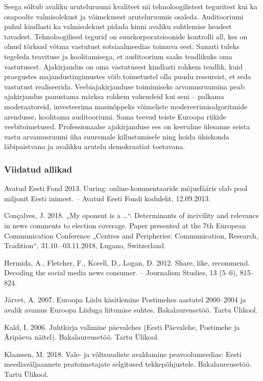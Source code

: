 \documentclass[estonian,]{article}
\begin{document}
Seega sõltub avaliku aruteluruumi kvaliteet nii tehnoloogilistest teguritest kui ka osapoolte valmisolekust ja võimekusest aruteluruumis osaleda. Auditooriumi puhul kindlasti ka valmisolekust pidada kinni avaliku suhtlemise headest tavadest. Tehnoloogilised tegurid on suurkorporatsioonide kontrolli all, kes on olnud tõrksad võtma vastutust sotsiaalmeedias toimuva eest. Samuti tuleks tegeleda teavituse ja koolitamisega, et auditoorium saaks teadlikuks oma vastutusest. Ajakirjandus on oma vastutusest kindlasti rohkem teadlik, kuid praegustes majandustingimustes võib toimetustel olla puudu ressursist, et seda vastutust realiseerida. Veebiajakirjanduse toimimiseks arvamusruumina peab ajakirjandus panustama märksa rohkem vahendeid kui seni -- palkama moderaatoreid, investeerima masinõppeks võimeliste modereerimisalgoritmide arendusse, koolitama auditooriumi. Sama teevad teiste Euroopa riikide veebitoimetused. Professionaalse ajakirjanduse ees on keeruline ülesanne seista vastu arvamusruumi üha suuremale killustumisele ning hoida ühiskonda läbipaistvana ja avalikku arutelu demokraatiat toetavana.

\hypertarget{viidatud-allikad-19}{%
\subsubsection*{Viidatud allikad}\label{viidatud-allikad-19}}

Avatud Eesti Fond 2013. Uuring: online-kommentaaride mõjusfääris elab pool miljonit Eesti inimest. -- Avatud Eesti Fondi koduleht, 12.09.2013.

Conçalves, J. 2018. „My oponent is a \ldots{}``. Determinants of incivility and relevance in news comments to election coverage. Paper presented at the 7th European Communication Conference „Centres and Peripheries: Communication, Research, Tradition``, 31.10.--03.11.2018, Lugano, Switzerland.

Hermida, A., Fletcher, F., Korell, D., Logan, D. 2012. Share, like, recommend. Decoding the social media news consumer. -- Journalism Studies, 13 (5--6), 815--824.

Järvet, A. 2007. Euroopa Liidu käsitlemine Postimehes aastatel 2000--2004 ja avalik avamus Euroopa Liiduga liitumise suhtes. Bakalaureusetöö. Tartu Ülikool.

Kald, I. 2006. Juhtkirja valimine päevalehes (Eesti Päevalehe, Postimehe ja Äripäeva näitel). Bakalaureusetöö. Tartu Ülikool.

Klaassen, M. 2018. Vale- ja võltsuudiste avaldamine peavoolumeedias: Eesti meediaväljaannete peatoimetajate selgitused tekkepõhjustele. Bakalaureusetöö. Tartu Ülikool.
\end{document}
